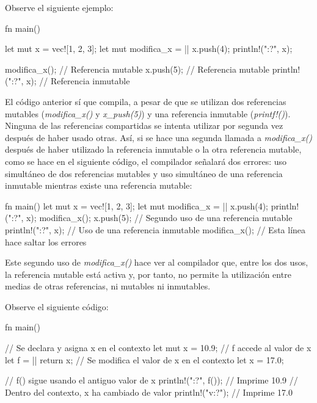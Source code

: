 Observe el siguiente ejemplo:

\vspace{0.7em}
\begin{Codigo}
fn main() {
   let mut x = vec![1, 2, 3];
   let mut modifica_x =  || {x.push(4); println!("{:?}", x)};
   
   modifica_x(); // Referencia mutable
   x.push(5);    // Referencia mutable
   println!("{:?}", x); // Referencia inmutable
}
\end{Codigo}

El código anterior sí que compila, a pesar de que se utilizan dos referencias mutables (\textit{modifica\_x()} y \textit{x\_push(5)}) y una referencia inmutable (\textit{printf!()}). Ninguna de las referencias compartidas se intenta utilizar por segunda vez después de haber usado otras. Así, si se hace una segunda llamada a \textit{modifica\_x()} después de haber utilizado la referencia inmutable o la otra referencia mutable, como se hace en el siguiente código, el compilador señalará dos errores: uso simultáneo de dos referencias mutables y uso simultáneo de una referencia inmutable mientras existe una referencia mutable:

\vspace{0.7em}
\begin{Codigo}
fn main() {
   let mut x = vec![1, 2, 3];
   let mut modifica_x =  || {x.push(4); println!("{:?}", x)};
   modifica_x();                                              
   x.push(5); // Segundo uso de una referencia mutable        
   println!("{:?}", x); // Uso de una referencia inmutable    
   modifica_x(); // Esta línea hace saltar los errores  
}
\end{Codigo}

Este segundo uso de \textit{modifica\_x()} hace ver al compilador que, entre los dos usos, la referencia mutable está activa y, por tanto, no permite la utilización entre medias de otras referencias, ni mutables ni inmutables.

Observe el siguiente código:

\vspace{0.7em}
\begin{Codigo}
fn main() {
   // Se declara y asigna x en el contexto
   let mut x = 10.9;
   // f accede al valor de x
   let f = || {return x};
   // Se modifica el valor de x en el contexto
   let x = 17.0;
   
   // f() sigue usando el antiguo valor de x
   println!("{:?}", f()); // Imprime 10.9
   // Dentro del contexto, x ha cambiado de valor
   println!("{v:?}");     // Imprime 17.0
}
\end{Codigo}

